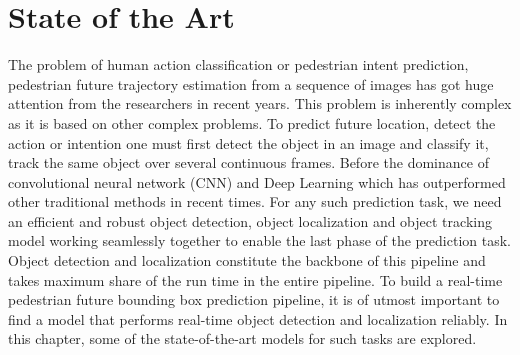 \chapter{State of the Art}








The problem of human action classification or pedestrian intent prediction, pedestrian future trajectory estimation \cite{saleh2017intent, fang2018pedestrian, abu2018will, dollar2005behavior, rasouli2017agreeing, cao2017realtime} from a sequence of images has got huge attention from the researchers in recent years. This problem is inherently complex as it is based on other complex problems. To predict future location, detect the action or intention one must first detect the object in an image and classify it, track the same object over several continuous frames. Before the dominance of convolutional neural network (CNN) and Deep Learning which has outperformed other traditional methods in recent times. For any such prediction task, we need an efficient and robust object detection, object localization and object tracking model working seamlessly together to enable the last phase of the prediction task. Object detection and localization constitute the backbone of this pipeline and takes maximum share of the run time in the entire pipeline. To build a real-time pedestrian future bounding box prediction pipeline, it is of utmost important to find a model that performs real-time object detection \cite{felzenszwalb2009object, walk2010new, liu2016ssd, szegedy2014scalable, dollar2009pedestrian, dollar2011pedestrian} and localization reliably. In this chapter, some of the state-of-the-art models for such tasks are explored.

